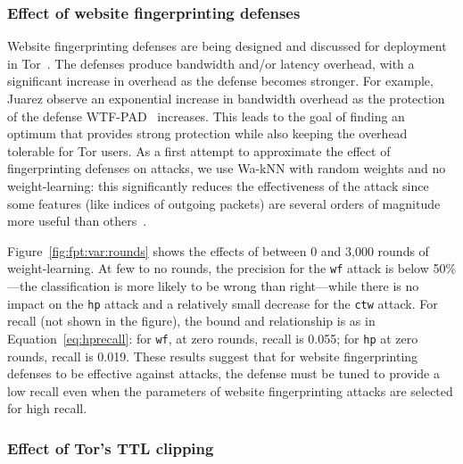 \subsubsection{Effect of website fingerprinting defenses}

Website fingerprinting defenses are being
designed and discussed for deployment in Tor~\cite{adapativepadding}.
The defenses produce bandwidth and/or latency overhead, with a significant
increase in overhead as the defense becomes stronger.
For example, Juarez \ea
observe an exponential increase in bandwidth overhead as the protection of the
defense WTF-PAD~\cite{Juarez2016a} increases.
This leads to the goal of finding an optimum that provides strong protection
while also keeping the overhead tolerable for Tor users.
As a first attempt to approximate the effect of fingerprinting
defenses on \name attacks, we use Wa-kNN with
random weights and no weight-learning: this significantly reduces the
effectiveness of the attack since some features (like indices of outgoing
packets) are several orders of magnitude more useful
than others~\cite{Juarez2016a}.

Figure~\ref{fig:fpt:var:rounds} shows the effects of between 0 and 3,000
rounds of weight-learning. At few to no rounds, the precision for the
\texttt{wf} attack is below 50\%---the classification is more likely to be wrong
than right---while there is no impact on the \texttt{hp} attack and a relatively
small decrease for the \texttt{ctw} attack.
For recall (not shown in the figure), the bound and relationship is
as in Equation~\ref{eq:hprecall}: for \texttt{wf}, at zero rounds, recall is
0.055; for \texttt{hp} at zero rounds, recall is 0.019. These results suggest
that for website fingerprinting defenses to be effective against \name attacks,
the defense must be tuned to provide a low recall even when the parameters of
website fingerprinting attacks are selected for high recall.

\subsubsection{Effect of Tor's TTL clipping}

